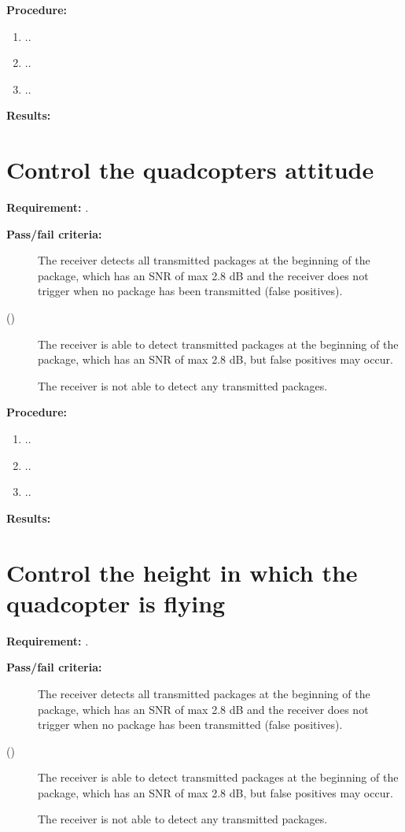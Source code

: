 		
\textbf{Procedure:}\\


\begin{enumerate}
	\item ..
	\item ..
	\item ..
\end{enumerate} 


\textbf{Results:}


\newpage

\section{Control the quadcopters attitude}
\textbf{Requirement: }
\textit{.}

\textbf{Pass/fail criteria:}
	\begin{description}
	\item[  ] The receiver detects all transmitted packages at the beginning of the package, which has an SNR of max 2.8 dB and the receiver does not trigger when no package has been transmitted (false positives).
	\item[()]The receiver is able to detect transmitted packages at the beginning of the package, which has an SNR of max 2.8 dB, but false positives may occur.
	\item[  \phantom{)}]The receiver is not able to detect any transmitted packages.
	\end{description}
		
\textbf{Procedure:}\\


\begin{enumerate}
	\item ..
	\item ..
	\item ..
\end{enumerate} 


\textbf{Results:}


\newpage

\section{Control the height in which the quadcopter is flying}
\textbf{Requirement: }
\textit{.}

\textbf{Pass/fail criteria:}
	\begin{description}
	\item[  ] The receiver detects all transmitted packages at the beginning of the package, which has an SNR of max 2.8 dB and the receiver does not trigger when no package has been transmitted (false positives).
	\item[()]The receiver is able to detect transmitted packages at the beginning of the package, which has an SNR of max 2.8 dB, but false positives may occur.
	\item[  \phantom{)}]The receiver is not able to detect any transmitted packages.
	\end{description}

